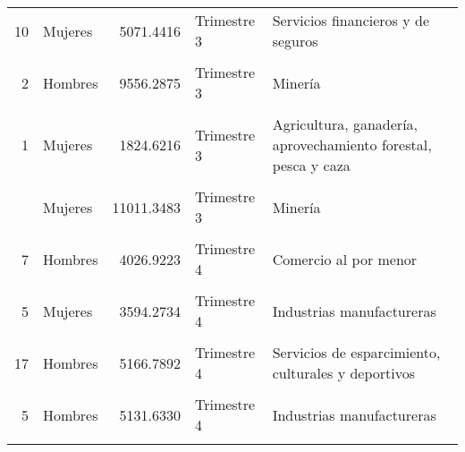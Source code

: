 \documentclass{article}
\begin{document}
\begin{table}[!h]
\begin{tabular}{rlrll}
10 & Mujeres & 5071.4416 & Trimestre 3 & Servicios financieros y de seguros\\
\addlinespace
\cellcolor{gray!10}{21} & \cellcolor{gray!10}{Mujeres} & \cellcolor{gray!10}{958.3927} & \cellcolor{gray!10}{Trimestre 3} & \cellcolor{gray!10}{No especificado}\\
2 & Hombres & 9556.2875 & Trimestre 3 & Minería\\
\cellcolor{gray!10}{21} & \cellcolor{gray!10}{Hombres} & \cellcolor{gray!10}{1564.7766} & \cellcolor{gray!10}{Trimestre 3} & \cellcolor{gray!10}{No especificado}\\
1 & Mujeres & 1824.6216 & Trimestre 3 & Agricultura, ganadería, aprovechamiento forestal, pesca y caza\\
\cellcolor{gray!10}{13} & \cellcolor{gray!10}{Hombres} & \cellcolor{gray!10}{8584.4490} & \cellcolor{gray!10}{Trimestre 3} & \cellcolor{gray!10}{Corporativos}\\
\addlinespace
2 & Mujeres & 11011.3483 & Trimestre 3 & Minería\\
\cellcolor{gray!10}{19} & \cellcolor{gray!10}{Hombres} & \cellcolor{gray!10}{4536.7088} & \cellcolor{gray!10}{Trimestre 4} & \cellcolor{gray!10}{Otros servicios, excepto actividades gubernamentales}\\
7 & Hombres & 4026.9223 & Trimestre 4 & Comercio al por menor\\
\cellcolor{gray!10}{12} & \cellcolor{gray!10}{Mujeres} & \cellcolor{gray!10}{4357.4588} & \cellcolor{gray!10}{Trimestre 4} & \cellcolor{gray!10}{Servicios profesionales, científicos y técnicos}\\
5 & Mujeres & 3594.2734 & Trimestre 4 & Industrias manufactureras\\
\addlinespace
\cellcolor{gray!10}{14} & \cellcolor{gray!10}{Mujeres} & \cellcolor{gray!10}{3724.3404} & \cellcolor{gray!10}{Trimestre 4} & \cellcolor{gray!10}{Servicios de apoyo a los negocios y manejo de desechos}\\
17 & Hombres & 5166.7892 & Trimestre 4 & Servicios de esparcimiento, culturales y deportivos\\
\cellcolor{gray!10}{6} & \cellcolor{gray!10}{Mujeres} & \cellcolor{gray!10}{4649.1663} & \cellcolor{gray!10}{Trimestre 4} & \cellcolor{gray!10}{Comercio al por mayor}\\
5 & Hombres & 5131.6330 & Trimestre 4 & Industrias manufactureras\\
\cellcolor{gray!10}{18} & \cellcolor{gray!10}{Mujeres} & \cellcolor{gray!10}{3416.0602} & \cellcolor{gray!10}{Trimestre 4} & \cellcolor{gray!10}{Servicios de hospedaje y de preparación de alimentos y bebidas}\\

\end{tabular}
\end{table}
\end{document}
